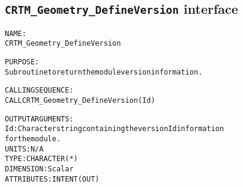 \subsection{\texttt{CRTM\_Geometry\_DefineVersion} interface}
  \label{sec:CRTM_Geometry_DefineVersion_interface}
  \begin{alltt}
 
  NAME:
        CRTM_Geometry_DefineVersion
 
  PURPOSE:
        Subroutine to return the module version information.
 
  CALLING SEQUENCE:
        CALL CRTM_Geometry_DefineVersion( Id )
 
  OUTPUT ARGUMENTS:
        Id:            Character string containing the version Id information
                       for the module.
                       UNITS:      N/A
                       TYPE:       CHARACTER(*)
                       DIMENSION:  Scalar
                       ATTRIBUTES: INTENT(OUT)
 
  \end{alltt}
